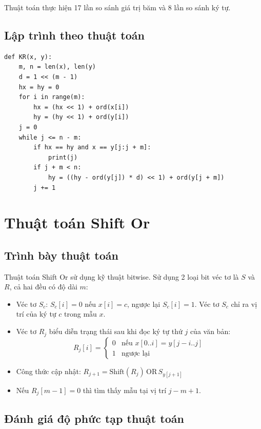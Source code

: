 \documentclass[12pt,twoside,openright]{extreport}
\begin{document}
Thuật toán thực hiện 17 lần so sánh giá trị băm và 8 lần so sánh ký tự.

\subsection{Lập trình theo thuật toán}

\begin{lstlisting}[style=PythonStyle]
def KR(x, y):
    m, n = len(x), len(y)
    d = 1 << (m - 1)
    hx = hy = 0
    for i in range(m):
        hx = (hx << 1) + ord(x[i])
        hy = (hy << 1) + ord(y[i])
    j = 0
    while j <= n - m:
        if hx == hy and x == y[j:j + m]:
            print(j)
        if j + m < n:
            hy = ((hy - ord(y[j]) * d) << 1) + ord(y[j + m])
        j += 1
\end{lstlisting}

\section{Thuật toán Shift Or}

\subsection{Trình bày thuật toán}

Thuật toán Shift Or sử dụng kỹ thuật bitwise. Sử dụng 2 loại bit véc tơ là $S$ và $R$, cả hai đều có độ dài $m$:

\begin{itemize}
	\item Véc tơ $S_c$: $S_c[i] = 0$ nếu $x[i] = c$, ngược lại $S_c[i] = 1$. Véc tơ $S_c$ chỉ ra vị trí của ký tự $c$ trong mẫu $x$.
	\item Véc tơ $R_j$ biểu diễn trạng thái sau khi đọc ký tự thứ $j$ của văn bản:
	\[
	R_j[i] = \begin{cases} 0 & \text{nếu } x[0..i] = y[j-i..j] \\ 1 & \text{ngược lại} \end{cases}
	\]
	\item Công thức cập nhật: $R_{j+1} = \text{Shift}(R_j) \,\text{OR}\, S_{y[j+1]}$
	\item Nếu $R_j[m-1] = 0$ thì tìm thấy mẫu tại vị trí $j - m + 1$.
\end{itemize}

\subsection{Đánh giá độ phức tạp thuật toán}
\end{document}

